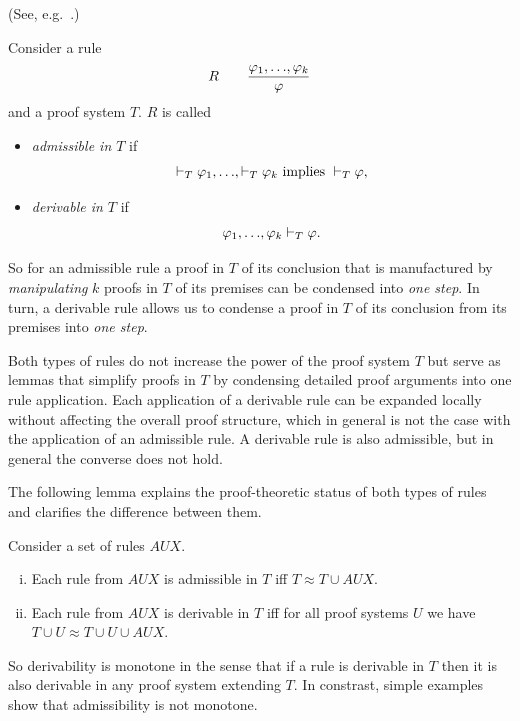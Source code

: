 \documentclass[runningheads]{llncs}       %
\newcommand{\AUX}{\mathit{AUX}}
\begin{document}
\begin{definition}(See, e.g.~\cite[page 47]{Pla13}.)
  
  Consider a rule
  \[ 
  R \qquad \frac{\varphi_1,\mbox{$\ldots$},\varphi_k}{\varphi}
\]
and a proof system $T$. $R$ is called
\begin{itemize}
\item \emph{admissible in $T$} if 
\[
 \vdash_T \varphi_1, \mbox{$\ldots$}, \vdash_T \varphi_k
 \mbox{ implies }
 \vdash_T \varphi,
\]

\item \emph{derivable in $T$} if 
\[
 \varphi_1, \mbox{$\ldots$}, \varphi_k \vdash_T \varphi.
\]

\end{itemize}

\end{definition}

So for an admissible rule a proof in $T$ of its conclusion 
that is manufactured by \emph{manipulating} $k$ proofs in $T$ 
of its premises can be condensed into \emph{one step}. 
In turn, a derivable rule allows us to condense a proof in $T$ of
its conclusion from its premises into \emph{one step}.

Both types of rules do not increase the power of the proof system $T$
but serve as lemmas that simplify proofs in $T$ by condensing detailed
proof arguments into one rule application.  Each application of a
derivable rule can be expanded locally without affecting the overall
proof structure, which in general is not the case with the application
of an admissible rule.  A derivable rule is also admissible, but in
general the converse does not hold.

The following lemma explains the proof-theoretic status of both types
of rules and clarifies the difference between them.

\begin{lemma} \label{lem:AUX}
  Consider a set of rules $\AUX$.
  \begin{enumerate}[(i)]
  \item 
  Each rule from $\AUX$ is admissible in $T$ iff $T \approx T \cup \AUX$. 

\item Each rule from $\AUX$ is derivable in $T$ iff for all proof
  systems $U$ we have $T \cup U \approx T \cup U \cup \AUX$.

\end{enumerate}
\end{lemma}

So derivability is monotone in the sense that if a rule is derivable
in $T$ then it is also derivable in any proof system extending $T$. In
constrast, simple examples show that admissibility is not monotone.
\end{document}
